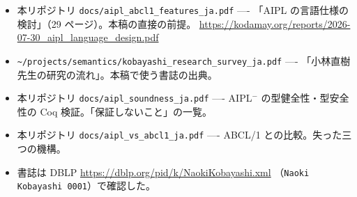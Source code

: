 \documentclass[11pt,a4paper]{ltjsarticle}
\theoremstyle{remark}
\begin{document}
\begin{itemize}
\item 本リポジトリ \texttt{docs/aipl\_abcl1\_features\_ja.pdf} ----
  「AIPL の言語仕様の検討」（29 ページ）。本稿の直接の前提。
  \url{https://kodamay.org/reports/2026-07-30_aipl_language_design.pdf}
\item \texttt{\textasciitilde/projects/semantics/kobayashi\_research\_survey\_ja.pdf} ----
  「小林直樹先生の研究の流れ」。本稿で使う書誌の出典。
\item 本リポジトリ \texttt{docs/aipl\_soundness\_ja.pdf} ----
  AIPL$^-$ の型健全性・型安全性の Coq 検証。「保証しないこと」の一覧。
\item 本リポジトリ \texttt{docs/aipl\_vs\_abcl1\_ja.pdf} ----
  ABCL/1 との比較。失った三つの機構。
\item 書誌は DBLP \url{https://dblp.org/pid/k/NaokiKobayashi.xml}
  （\texttt{Naoki Kobayashi 0001}）で確認した。
\end{itemize}
\end{document}
